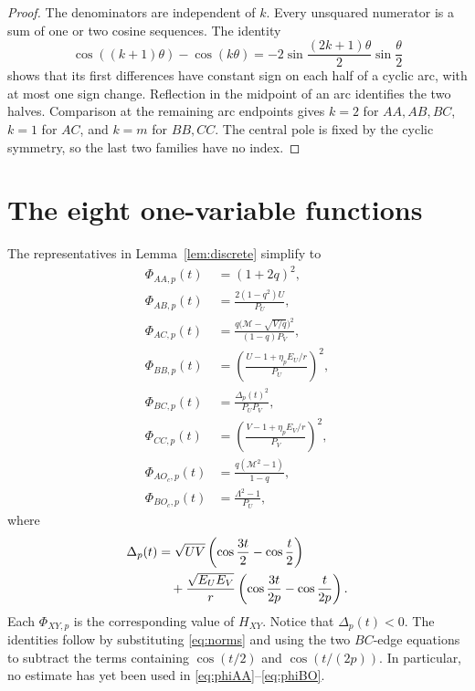 \documentclass{amsart}
\begin{document}
\begin{proof}
The denominators are independent of \(k\).  Every unsquared numerator is
a sum of one or two cosine sequences.  The identity
\[
 \cos((k+1)\theta)-\cos(k\theta)
 =-2\sin\frac{(2k+1)\theta}{2}\sin\frac\theta2
\]
shows that its first differences have constant sign on each half of a
cyclic arc, with at most one sign change.  Reflection in the midpoint of an
arc identifies the two halves.  Comparison at the remaining arc endpoints
gives \(k=2\) for \(AA,AB,BC\), \(k=1\) for \(AC\), and \(k=m\) for
\(BB,CC\).  The central pole is fixed by the cyclic symmetry, so the last
two families have no index.
\end{proof}

\section{The eight one-variable functions}

The representatives in Lemma~\ref{lem:discrete} simplify to
\begin{align}
 \Phi_{AA,p}(t)&=(1+2q)^2,\label{eq:phiAA}\\
 \Phi_{AB,p}(t)&=\frac{2(1-q^2)U}{P_U},\label{eq:phiAB}\\
 \Phi_{AC,p}(t)&=
 \frac{q\bigl(\mathcal M-\sqrt{V/q}\bigr)^2}{(1-q)P_V},
 \label{eq:phiAC}\\
 \Phi_{BB,p}(t)&=
 \left(\frac{U-1+\eta_pE_U/r}{P_U}\right)^2,
 \label{eq:phiBB}\\
 \Phi_{BC,p}(t)&=\frac{\Delta_p(t)^2}{P_UP_V},\label{eq:phiBC}\\
 \Phi_{CC,p}(t)&=
 \left(\frac{V-1+\eta_pE_V/r}{P_V}\right)^2,
 \label{eq:phiCC}\\
 \Phi_{AO_c,p}(t)&=\frac{q(\mathcal M^2-1)}{1-q},
 \label{eq:phiAO}\\
 \Phi_{BO_c,p}(t)&=\frac{\Lambda^2-1}{P_U},\label{eq:phiBO}
\end{align}
where
\begin{align}\label{eq:delta}
 \Delta_p(t)
 &=\sqrt{UV}\left(\cos\frac{3t}{2}-\cos\frac t2\right)\notag\\
 &\quad+\frac{\sqrt{E_UE_V}}{r}
 \left(\cos\frac{3t}{2p}-\cos\frac{t}{2p}\right).
\end{align}
Each \(\Phi_{XY,p}\) is the corresponding value of \(H_{XY}\).
Notice that \(\Delta_p(t)<0\).  The identities follow by substituting
\eqref{eq:norms} and using the two \(BC\)-edge equations to subtract the
terms containing \(\cos(t/2)\) and \(\cos(t/(2p))\).  In particular, no
estimate has yet been used in \eqref{eq:phiAA}--\eqref{eq:phiBO}.
\end{document}
